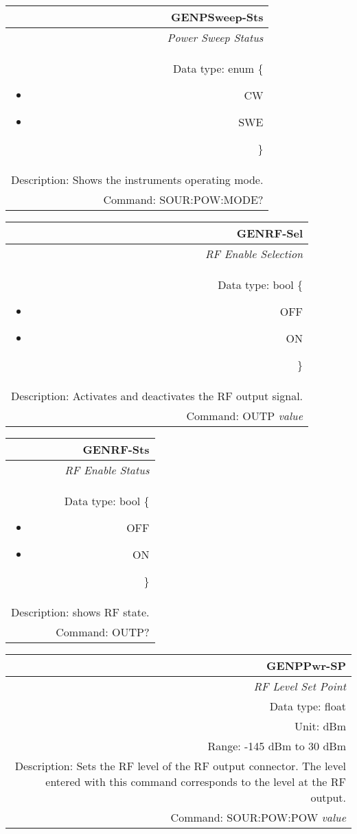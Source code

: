 \documentclass[openany]{article}
\begin{document}
		\begin{tabular}{N}
			\hline
			\bfseries GENPSweep-Sts \\ \hline
			\emph{Power Sweep Status} \\
			Data type: enum \{\begin{itemize}[noitemsep]
				\small
				\item[] CW
				\item[] SWE
			\end{itemize}\} \\
			Description: Shows the instruments operating mode.\\
			Command: SOUR:POW:MODE? \\

		\end{tabular}
%
		\begin{tabular}{N}
			\hline
			\bfseries GENRF-Sel \\ \hline
			\emph{RF Enable Selection} \\
			Data type: bool \{\begin{itemize}[noitemsep]
				\small
				\item[] OFF
				\item[] ON
			\end{itemize}\} \\
			Description: Activates and deactivates the RF output signal. \\
			Command: OUTP \emph{value} \\

		\end{tabular}


		\begin{tabular}{N}
			\hline
			\bfseries GENRF-Sts \\ \hline
			\emph{RF Enable Status} \\
			Data type: bool \{\begin{itemize}[noitemsep]
				\small
				\item[] OFF
				\item[] ON
			\end{itemize}\} \\
			Description: shows RF state. \\
			Command: OUTP? \\

		\end{tabular}
%
		\begin{tabular}{N}
			\hline
			\bfseries GENPPwr-SP \\ \hline
			\emph{RF Level Set Point} \\
			Data type: float \\
			Unit: dBm \\
			Range: -145 dBm to 30 dBm \\
			Description: Sets the RF level of the RF output connector. The level entered with this command corresponds to the level at the RF output. \\
			Command: SOUR:POW:POW \emph{value} \\

		\end{tabular}
\end{document}
